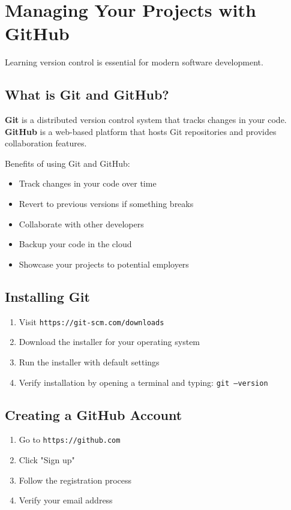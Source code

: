 \documentclass{article}
\begin{document}
\section{Managing Your Projects with GitHub}
Learning version control is essential for modern software development.

\subsection{What is Git and GitHub?}
\textbf{Git} is a distributed version control system that tracks changes in your code. \textbf{GitHub} is a web-based platform that hosts Git repositories and provides collaboration features.

Benefits of using Git and GitHub:
\begin{itemize}
    \item Track changes in your code over time
    \item Revert to previous versions if something breaks
    \item Collaborate with other developers
    \item Backup your code in the cloud
    \item Showcase your projects to potential employers
\end{itemize}

\subsection{Installing Git}
\begin{enumerate}
    \item Visit \texttt{https://git-scm.com/downloads}
    \item Download the installer for your operating system
    \item Run the installer with default settings
    \item Verify installation by opening a terminal and typing: \texttt{git --version}
\end{enumerate}

\subsection{Creating a GitHub Account}
\begin{enumerate}
    \item Go to \texttt{https://github.com}
    \item Click "Sign up"
    \item Follow the registration process
    \item Verify your email address
\end{enumerate}
\end{document}
